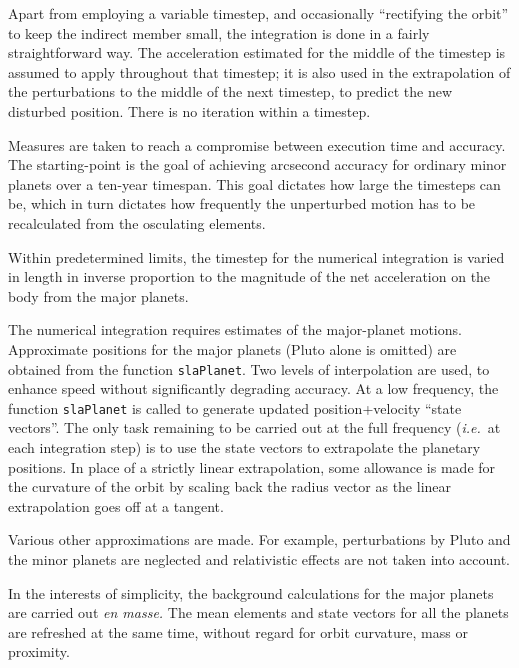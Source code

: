 \documentclass[11pt,fleqn,twoside]{article}
\renewcommand{\_}{{\tt\char'137}}     %
\begin{document}
{\begin{enumerate}
        Apart from employing a variable timestep, and occasionally
        ``rectifying the orbit'' to keep the indirect member small, the
        integration is done in a fairly straightforward way.  The
        acceleration estimated for the middle of the timestep is assumed
        to apply throughout that timestep;  it is also used in the
        extrapolation of the perturbations to the middle of the next
        timestep, to predict the new disturbed position.  There is no
        iteration within a timestep.
 
        Measures are taken to reach a compromise between execution time
        and accuracy.  The starting-point is the goal of achieving
        arcsecond accuracy for ordinary minor planets over a ten-year
        timespan.  This goal dictates how large the timesteps can be,
        which in turn dictates how frequently the unperturbed motion has
        to be recalculated from the osculating elements.
 
        Within predetermined limits, the timestep for the numerical
        integration is varied in length in inverse proportion to the
        magnitude of the net acceleration on the body from the major
        planets.
 
        The numerical integration requires estimates of the major-planet
        motions.  Approximate positions for the major planets (Pluto
        alone is omitted) are obtained from the function {\tt slaPlanet}.  Two
        levels of interpolation are used, to enhance speed without
        significantly degrading accuracy.  At a low frequency, the function
        {\tt slaPlanet} is called to generate updated position+velocity ``state
        vectors''.  The only task remaining to be carried out at the full
        frequency ({\it i.e.}~at each integration step) is to use the state
        vectors to extrapolate the planetary positions.  In place of a
        strictly linear extrapolation, some allowance is made for the
        curvature of the orbit by scaling back the radius vector as the
        linear extrapolation goes off at a tangent.
 
        Various other approximations are made.  For example, perturbations
        by Pluto and the minor planets are neglected and relativistic
        effects are not taken into account.
 
        In the interests of simplicity, the background calculations for
        the major planets are carried out {\it en masse.}
        The mean elements and
        state vectors for all the planets are refreshed at the same time,
        without regard for orbit curvature, mass or proximity.
 

\end{enumerate}}
\end{document}
